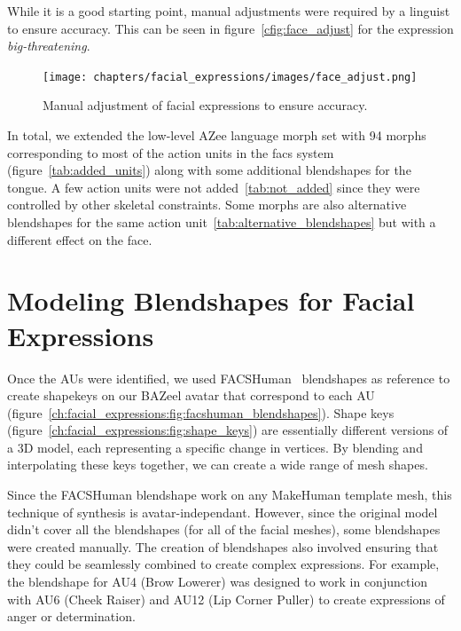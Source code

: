 \documentclass[../../main]{subfiles}
\begin{document}
While it is a good starting point, manual adjustments were required by a linguist to ensure accuracy. This can be seen in figure~\ref{cfig:face_adjust} for the expression \emph{big-threatening}.

\begin{figure}
    \centering
    \texttt{[image: chapters/facial\_expressions/images/face\_adjust.png]}
    \caption{Manual adjustment of facial expressions to ensure accuracy.}
    \label{ch:facial_expressions:fig:face_adjust}
\end{figure}

In total, we extended the low-level AZee language morph set with 94 morphs corresponding to most of the action units in the \gls{facs} system (figure~\ref{tab:added_units}) along with some additional blendshapes for the tongue. A few action units were not added~\ref{tab:not_added} since they were controlled by other skeletal constraints. Some morphs are also alternative blendshapes for the same action unit~\ref{tab:alternative_blendshapes} but with a different effect on the face.

\section{Modeling Blendshapes for Facial Expressions}
\label{ch:facial_expressions:blendshape_creation}

Once the AUs were identified, we used FACSHuman~\cite{gilbert2021facshuman} blendshapes as reference to create shapekeys on our BAZeel avatar that correspond to each AU (figure~\ref{ch:facial_expressions:fig:facshuman_blendshapes}). Shape keys (figure~\ref{ch:facial_expressions:fig:shape_keys}) are essentially different versions of a 3D model, each representing a specific change in vertices. By blending and interpolating these keys together, we can create a wide range of mesh shapes.

Since the FACSHuman blendshape work on any MakeHuman template mesh, this technique of synthesis is avatar-independant. However, since the original model didn't cover all the blendshapes (for all of the facial meshes), some blendshapes were created manually. The creation of blendshapes also involved ensuring that they could be seamlessly combined to create complex expressions. For example, the blendshape for AU4 (Brow Lowerer) was designed to work in conjunction with AU6 (Cheek Raiser) and AU12 (Lip Corner Puller) to create expressions of anger or determination.
\end{document}
